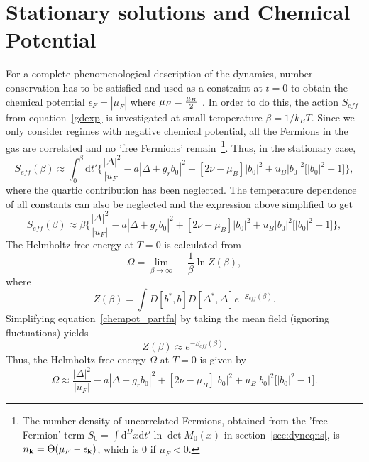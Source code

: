 \documentclass[a4paper,10pt]{article}
\begin{document}
\section{Stationary solutions and Chemical Potential}
\label{sec:fpchempot}
For a complete phenomenological description of the dynamics, number conservation has to be satisfied and used as a constraint at $t=0$ to obtain the chemical potential $\epsilon_F=|\mu_F|$ where $\mu_F = {\mu_B \over 2}$ . In order to do this, the action $S_{eff}$ from equation~\ref{gdexp} is investigated at small temperature $\beta=1/k_BT$. Since we only consider regimes with negative chemical potential, all the Fermions in the gas are correlated and no 'free Fermions' remain~\footnote{The number density of uncorrelated Fermions, obtained from the 'free Fermion' term $S_0= \int{{\mathrm d}^Dx {\mathrm d}t'} \ln\det{M_0(x)}$ in section~\ref{sec:dyneqns}, is $n_{\bf k}=\Theta(\mu_F-\epsilon_{\bf k})$, which is $0$ if $\mu_F<0$.}. Thus, in the stationary case, 
\begin{equation}
\label{gdexp:hom}
S_{eff}(\beta)\approx\int^\beta_0{\mathrm d}t'\bigg\{\frac{|\Delta|^2}{|u_F|}-a|\Delta+g_rb^{ }_0|^2 + \left[2\nu-\mu_B\right]|b_0|^2  + u_B|b_0|^2\bigg[|b_0|^2-1 \bigg]\bigg\},
\end{equation}
where the quartic contribution has been neglected. The temperature dependence of all constants can also be neglected and the expression above simplified to get
\begin{equation}
S_{eff}(\beta)\approx \beta \bigg\{\frac{|\Delta|^2}{|u_F|}-a|\Delta+g_rb^{ }_0|^2 + \left[2\nu-\mu_B\right]|b_0|^2  + u_B|b_0|^2\bigg[|b_0|^2-1 \bigg]\bigg\},
\end{equation}
The Helmholtz free energy at $T=0$ is calculated from 
\begin{equation}
 \Omega = \lim_{\beta\rightarrow\infty} -\frac{1}{\beta}\ln{Z(\beta)},
\end{equation}
where
\begin{equation}
\label{chempot_partfn}
Z(\beta) = \int D[b^*, b] D[\Delta^*, \Delta] e^{-S_{eff}(\beta)}.
\end{equation}
Simplifying equation~\ref{chempot_partfn} by taking the mean field (ignoring fluctuations) yields
\begin{equation}
\label{chempot_partfn_mf}
Z(\beta) \approx e^{-S_{eff}(\beta)}.
\end{equation}
Thus, the Helmholtz free energy $\Omega$ at $T=0$ is given by
\begin{equation}
\Omega \approx \frac{|\Delta|^2}{|u_F|}-a|\Delta+g_rb^{ }_0|^2 +\left[2\nu-\mu_B\right]|b_0|^2  + u_B|b_0|^2\bigg[|b_0|^2-1 \bigg].
\end{equation}
\end{document}
